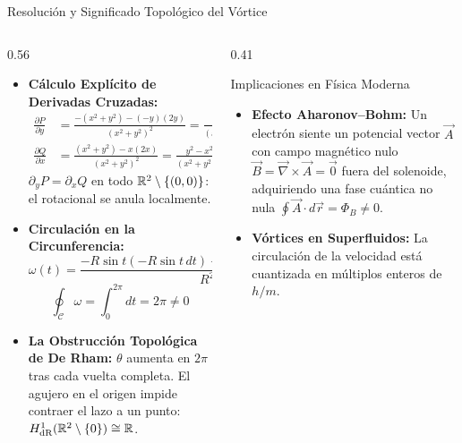 \documentclass[10pt,aspectratio=169]{beamer}
\begin{document}
\begin{frame}{Resolución y Significado Topológico del Vórtice}
  \begin{columns}[c]
    \begin{column}{0.56\textwidth}
      \footnotesize
      \begin{itemize}\itemsep2pt
        \item \textbf{Cálculo Explícito de Derivadas Cruzadas:}
        {\scriptsize
        \begin{align*}
          \frac{\partial P}{\partial y} &= \frac{-(x^2+y^2) - (-y)(2y)}{(x^2+y^2)^2} = \frac{y^2 - x^2}{(x^2+y^2)^2}, \\
          \frac{\partial Q}{\partial x} &= \frac{(x^2+y^2) - x(2x)}{(x^2+y^2)^2} = \frac{y^2 - x^2}{(x^2+y^2)^2}.
        \end{align*}
        }
        $\partial_y P = \partial_x Q$ en todo $\mathbb{R}^2\setminus\{(0,0)\}$: el rotacional se anula localmente.
        \item \textbf{Circulación en la Circunferencia:}
        \[
        \omega(t) = \frac{-R\sin t(-R\sin t\,dt) + R\cos t(R\cos t\,dt)}{R^2} = dt.
        \]
        \[
        \oint_\mathcal{C} \omega = \int_0^{2\pi} dt = \boxed{2\pi \neq 0}
        \]
        \item \textbf{La Obstrucción Topológica de De Rham:}
        $\theta$ aumenta en $2\pi$ tras cada vuelta completa. El agujero en el origen impide contraer el lazo a un punto: $H^1_{\text{dR}}(\mathbb{R}^2\setminus\{0\}) \cong \mathbb{R}$.
      \end{itemize}
    \end{column}
    \begin{column}{0.41\textwidth}
      \footnotesize
      \begin{block}{Implicaciones en Física Moderna}
        \scriptsize
        \begin{itemize}\itemsep3pt
          \item \textbf{Efecto Aharonov--Bohm:}
          Un electrón siente un potencial vector $\vec{A}$ con campo magnético nulo $\vec{B} = \vec{\nabla}\times\vec{A} = \vec{0}$ fuera del solenoide, adquiriendo una fase cuántica no nula $\oint \vec{A}\cdot d\vec{r} = \Phi_B \neq 0$.
          \item \textbf{Vórtices en Superfluidos:}
          La circulación de la velocidad está cuantizada en múltiplos enteros de $h/m$.
        \end{itemize}
      \end{block}
    \end{column}
  \end{columns}
\end{frame}
\end{document}
